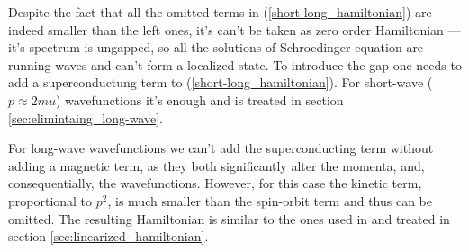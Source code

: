   Despite the fact that all the omitted terms in (\ref{short-long_hamiltonian}) are indeed smaller than the left ones, it's can't be taken as zero order Hamiltonian --- it's spectrum is ungapped, so all the solutions of Schroedinger equation are running waves and can't form a localized state. To introduce the gap one needs to add a superconductung term to (\ref{short-long_hamiltonian}). For short-wave ($ p\approx2mu $) wavefunctions it's enough and is treated in section \ref{sec:elimintaing_long-wave}.
  
  For long-wave wavefunctions we can't add the superconducting term without adding a magnetic term, as they both significantly alter the momenta, and, consequentially, the wavefunctions. However, for this case the kinetic term, proportional to $ p^2 $, is much smaller than the spin-orbit term  and thus can be omitted. The resulting Hamiltonian is similar to the ones used in \cite{Oreg_2010,Lutchyn_2010} and treated in section \ref{sec:linearized_hamiltonian}. 
  
